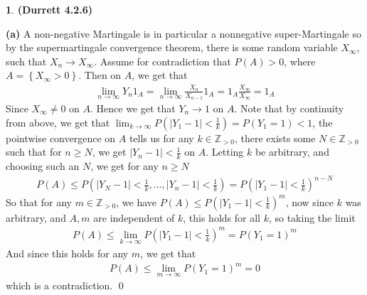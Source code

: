 \documentclass{article}
\theoremstyle{definition}
\newtheorem{pb}{}
\newcommand{\set}[1]{\left\{#1\right\}}
\newcommand{\abs}[1]{\left\vert#1\right\vert}
\begin{document}
    \begin{pb}\textbf{(Durrett 4.2.6)}
        
        \textbf{(a)} A non-negative Martingale is in particular a nonnegative super-Martingale so by the supermartingale convergence theorem, there is some random variable \(X_\infty\), such that \(X_n \to X_\infty\). Assume for contradiction that \(P(A) > 0\), where \(A = \set{X_{\infty} > 0}\). Then on \(A\), we get that
        \begin{align*}
            \lim_{n\to\infty}Y_n1_A = \lim_{n\to\infty} \frac{X_n}{X_{n-1}}1_A = 1_A \frac{X_\infty}{X_\infty} = 1_A
        \end{align*}
        Since \(X_\infty \neq 0\) on \(A\). Hence we get that \(Y_n \to 1\) on \(A\). Note that by continuity from above, we get that \(\lim_{k\to\infty}P(\abs{Y_1-1} < \frac{1}{k}) = P(Y_1 = 1) < 1\), the pointwise convergence on \(A\) tells us for any \(k \in \mathbb{Z}_{>0}\), there exists some \(N \in \mathbb{Z}_{> 0}\) such that for \(n \geq N\), we get \(\abs{Y_n - 1} < \frac{1}{k}\) on \(A\). Letting \(k\) be arbitrary, and choosing such an \(N\), we get for any \(n \geq N\)
        \begin{align*}
            P(A) \leq P\left(\abs{Y_N - 1} < \frac{1}{k},\hdots, \abs{Y_n - 1} < \frac{1}{k}\right) = P\left(\abs{Y_1 - 1} < \frac{1}{k}\right)^{n-N}
        \end{align*}
    So that for any \(m \in \mathbb{Z}_{>0}\), we have \(P(A) \leq P\left(\abs{Y_1 - 1} < \frac{1}{k}\right)^m\), now since \(k\) was arbitrary, and \(A, m\) are independent of \(k\), this holds for all \(k\), so taking the limit
    \begin{align*}
        P(A) \leq \lim_{k\to\infty}P\left(\abs{Y_1 - 1} < \frac{1}{k}\right)^m = P(Y_1 = 1)^m
    \end{align*}
    And since this holds for any \(m\), we get that
    \begin{align*}
        P(A) \leq \lim_{m\to\infty}P(Y_1 = 1)^m = 0
    \end{align*}
    which is a contradiction. \qed


\end{pb}
\end{document}

